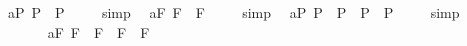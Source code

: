 \begin{isabellebody}
\ a{}{}{\isacharunderscore}{}{\isacharunderscore}P{\isacharcolon}\ {\isachardoublequoteopen}{\isacharbrackleft}{\isasymA}{\isacharparenleft}{\isasymphi}\isactrlsup P{\isacharparenright}\ \isactrlbold {\isasymequiv}\ {\isasymA}{\isacharparenleft}{\isasymA}{\isacharparenleft}{\isasymphi}\isactrlsup P{\isacharparenright}{\isacharparenright}{\isacharbrackright}\ {\isacharequal}\ {\isasymtop}{\isachardoublequoteclose}%
\isadelimproof
\ %
\endisadelimproof
%
\isatagproof
{}\isamarkupfalse%
\ simp\ \isamarkupfalse%
%
\endisatagproof
{\isafoldproof}%
%
\isadelimproof
%
\endisadelimproof
\isanewline
{}\isamarkupfalse%
\ a{}{}{\isacharunderscore}{}{\isacharunderscore}F{\isacharcolon}\ {\isachardoublequoteopen}{\isacharbrackleft}{\isasymA}{\isacharparenleft}{\isasymphi}\isactrlsup F{\isacharparenright}\ \isactrlbold {\isasymequiv}\ {\isasymA}{\isacharparenleft}{\isasymA}{\isacharparenleft}{\isasymphi}\isactrlsup F{\isacharparenright}{\isacharparenright}{\isacharbrackright}\ {\isacharequal}\ {\isasymtop}{\isachardoublequoteclose}%
\isadelimproof
\ %
\endisadelimproof
%
\isatagproof
{}\isamarkupfalse%
\ simp\ \isamarkupfalse%
%
\endisatagproof
{\isafoldproof}%
%
\isadelimproof
%
\endisadelimproof
%
\isamarkuptrue%
\isamarkupfalse%
\ a{}{}{\isacharunderscore}{}{\isacharunderscore}P{\isacharcolon}\ {\isachardoublequoteopen}{\isacharbrackleft}{\isacharparenleft}\isactrlbold {\isasymbox}{\isacharparenleft}{\isasymphi}\isactrlsup P\ \isactrlbold {\isasymrightarrow}\ {\isacharparenleft}{\isasymphi}\isactrlsup P{\isacharparenright}{\isacharparenright}{\isacharparenright}\ \isactrlbold {\isasymrightarrow}\ {\isacharparenleft}\isactrlbold {\isasymbox}{\isacharparenleft}{\isasymphi}\isactrlsup P{\isacharparenright}\ \isactrlbold {\isasymrightarrow}\ \isactrlbold {\isasymbox}{\isacharparenleft}{\isasymphi}\isactrlsup P{\isacharparenright}{\isacharparenright}{\isacharbrackright}\ {\isacharequal}\ {\isasymtop}{\isachardoublequoteclose}%
\isadelimproof
\ %
\endisadelimproof
%
\isatagproof
{}\isamarkupfalse%
\ simp\ \isamarkupfalse%
%
\endisatagproof
{\isafoldproof}%
%
\isadelimproof
%
\endisadelimproof
\ \ \ \ \ \isanewline
{}\isamarkupfalse%
\ a{}{}{\isacharunderscore}{}{\isacharunderscore}F{\isacharcolon}\ {\isachardoublequoteopen}{\isacharbrackleft}{\isacharparenleft}\isactrlbold {\isasymbox}{\isacharparenleft}{\isasymphi}\isactrlsup F\ \isactrlbold {\isasymrightarrow}\ {\isacharparenleft}{\isasymphi}\isactrlsup F{\isacharparenright}{\isacharparenright}{\isacharparenright}\ \isactrlbold {\isasymrightarrow}\ {\isacharparenleft}\isactrlbold {\isasymbox}{\isacharparenleft}{\isasymphi}\isactrlsup F{\isacharparenright}\ \isactrlbold {\isasymrightarrow}\ \isactrlbold {\isasymbox}{\isacharparenleft}{\isasymphi}\isactrlsup F{\isacharparenright}{\isacharparenright}{\isacharbrackright}\ {\isacharequal}\ {\isasymtop}{\isachardoublequoteclose}%

\end{isabellebody}
